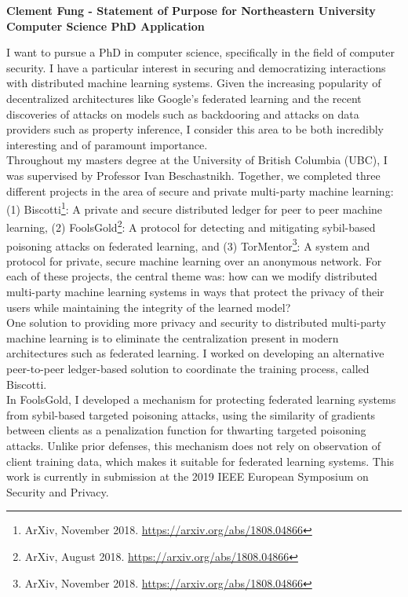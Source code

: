 \documentclass[10pt]{article} %
\begin{document}
\begin{center}
{\bf Clement Fung - Statement of Purpose for Northeastern University Computer Science PhD Application}
\end{center}

I want to pursue a PhD in computer science, specifically in the field of computer security. I have a particular interest in securing and democratizing interactions with distributed machine learning systems. Given the increasing popularity of decentralized architectures like Google’s federated learning and the recent discoveries of attacks on models such as backdooring and attacks on data providers such as property inference, I consider this area to be both incredibly interesting and of paramount importance. \\

Throughout my masters degree at the University of British Columbia (UBC), I was supervised by Professor Ivan Beschastnikh. Together, we completed three different projects in the area of secure and private multi-party machine learning: (1) Biscotti\footnote{ArXiv, November 2018. \url{https://arxiv.org/abs/1808.04866}}: A private and secure distributed ledger for peer to peer machine learning, (2) FoolsGold\footnote{ArXiv, August 2018. \url{https://arxiv.org/abs/1808.04866}}: A protocol for detecting and mitigating sybil-based poisoning attacks on federated learning, and (3) TorMentor\footnote{ArXiv, November 2018. \url{https://arxiv.org/abs/1808.04866}}: A system and protocol for private, secure machine learning over an anonymous network.
For each of these projects, the central theme was: how can we modify distributed multi-party machine learning systems in ways that protect the privacy of their users while maintaining the integrity of the learned model? \\

One solution to providing more privacy and security to distributed multi-party machine learning is to eliminate the centralization present in modern architectures such as federated learning. I worked on developing an alternative peer-to-peer ledger-based solution to coordinate the training process, called Biscotti. \\

In FoolsGold, I developed a mechanism for protecting federated learning systems from sybil-based targeted poisoning attacks, using the similarity of gradients between clients as a penalization function for thwarting targeted poisoning attacks. Unlike prior defenses, this mechanism does not rely on observation of client training data, which makes it suitable for federated learning systems. This work is currently in submission at the 2019 IEEE European Symposium on Security and Privacy. \\
\end{document}
